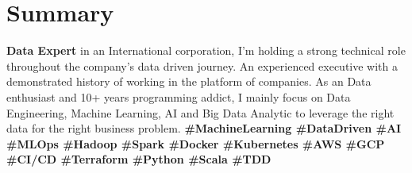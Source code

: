 \section{Summary}
  \textbf{Data Expert} in an International corporation, I’m holding a strong technical role throughout the company’s data driven journey. An experienced executive with a demonstrated history of working in the platform of companies. As an Data enthusiast and 10+ years programming addict, I mainly focus on Data Engineering, Machine Learning, AI and Big Data Analytic to leverage the right data for the right business problem.
  \textbf{\scriptsize{
    \#MachineLearning
    \#DataDriven
    \#AI
    \#MLOps
    \#Hadoop
    \#Spark
    \#Docker
    \#Kubernetes
    \#AWS
    \#GCP
    \#CI/CD
    \#Terraform
    \#Python
    \#Scala
    \#TDD
  }}
